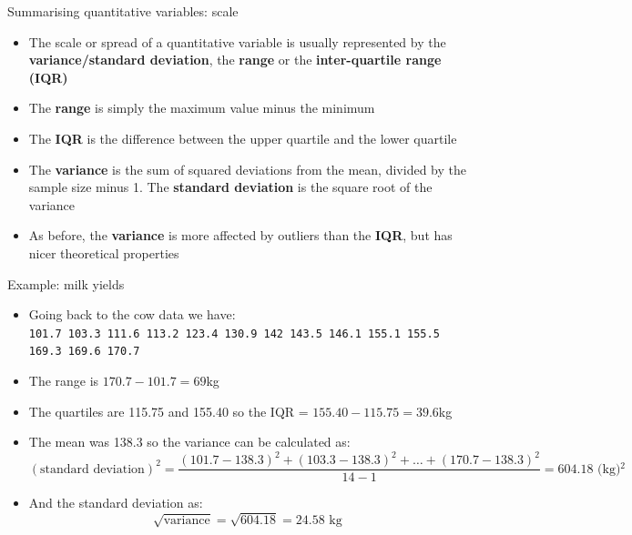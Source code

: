 \documentclass[12pt,xcolor=dvipsnames,handout,mathserif,aspectratio=169]{beamer}
\newcommand{\bbl}[1]{{\color{NavyBlue} \textbf{#1}}}
\newcommand{\bre}[1]{{\color{red} \textbf{#1}}}
\newcommand{\bgr}[1]{{\color{PineGreen} \textbf{#1}}}
\begin{document}
\begin{frame}{Summarising quantitative variables: scale }

\begin{itemize}
\item The scale or spread of a quantitative variable is usually represented by the \bbl{variance/standard deviation}, the \bgr{range} or the \bre{inter-quartile range (IQR)}
\pause
\item The \bgr{range} is simply the maximum value minus the minimum
\pause
\item The \bre{IQR} is the difference between the upper quartile and the lower quartile
\pause
\item The \bbl{variance} is the sum of squared deviations from the mean, divided by the sample size minus 1. The \bbl{standard deviation} is the square root of the variance
\pause
\item As before, the \bbl{variance} is more affected by outliers than the \bre{IQR}, but has nicer theoretical properties
\end{itemize}
\pause
\end{frame}

\begin{frame}{ Example: milk yields }

\begin{itemize}
\item Going back to the cow data we have:\\
\texttt{101.7 103.3 111.6 113.2 123.4 130.9 142 143.5 146.1 155.1 155.5 169.3 169.6 170.7}\\

\pause
\item The range is $170.7 - 101.7 = 69$kg
\pause
\item The quartiles are 115.75 and 155.40 so the IQR = $155.40 - 115.75 = 39.6$kg
\pause
\item The mean was 138.3 so the variance can be calculated as:
\scriptsize
$$(\mbox{standard deviation})^{2} = \frac{ (101.7 - 138.3)^{2} + (103.3 - 138.3)^{2} + \ldots + (170.7-138.3)^{2} }{ 14 - 1} = 604.18\mbox{ (kg)$^2$}$$
\normalsize
\pause
\vspace{-0.3cm}
\item And the standard deviation as:
$$\sqrt{\mbox{variance}} = \sqrt{604.18} = 24.58\mbox{ kg}$$
\end{itemize}
\end{frame}
\end{document}
